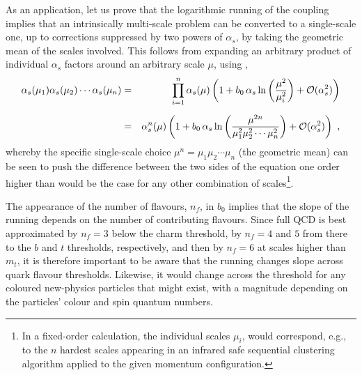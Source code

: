 %
As an application, let us prove that the 
logarithmic running of the coupling implies that an intrinsically 
multi-scale problem can be converted to a single-scale one, up to
corrections suppressed by two powers of $\alpha_s$, 
by taking the geometric mean of the scales involved. This follows from
expanding an arbitrary product of individual  $\alpha_s$ factors around an
arbitrary scale $\mu$, using , 
\begin{eqnarray}
\alpha_s(\mu_1)\alpha_s(\mu_2)\cdots\alpha_s(\mu_n) & = &
\prod_{i=1}^{n} \alpha_s(\mu) \left(1 +
b_0\,\alpha_s\ln\left(\frac{\mu^2}{\mu_i^2}\right) + {\cal O}(\alpha_s^2)\right)
\nonumber\\[2mm]
& = & \alpha_s^n(\mu) \left(1 + b_0\, \alpha_s \ln \left(
 \frac{\mu^{2n}}{\mu_1^2\mu_2^2\cdots\mu_n^2}\right) +  {\cal
   O}(\alpha_s^2) \right)~,
\end{eqnarray}
whereby the specific single-scale choice $\mu^n =
\mu_1\mu_2\cdots\mu_n$ (the geometric mean) can
be seen to push the difference between the two sides of the equation one order higher
than would be the case for any other combination of scales\footnote{In
  a fixed-order calculation, the individual scales $\mu_i$,
would correspond, e.g., to the $n$ hardest scales appearing in an infrared
safe sequential clustering algorithm applied to the given momentum
configuration.}. 

The appearance of the number of flavours, $n_f$, in $b_0$ implies that the
slope of the running depends on the number of contributing
flavours. Since full QCD is best approximated by $n_f=3$
below the charm threshold, by $n_f=4$ and $5$ from there to the $b$
and $t$ thresholds, respectively, and then by $n_f=6$ at scales
higher than $m_t$, it is therefore important to be aware that 
the running changes slope across quark flavour
thresholds. Likewise, it would change across the threshold for any coloured
new-physics particles that might exist, with a magnitude depending on
the particles' colour and spin quantum numbers.

